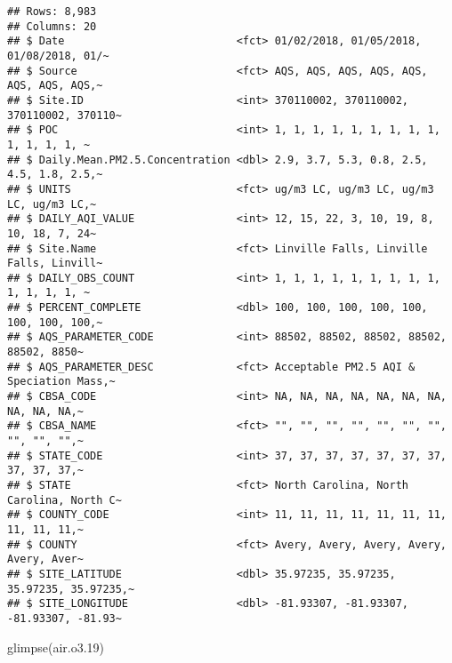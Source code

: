 \documentclass[
]{article}
\newenvironment{Shaded}{\begin{snugshade}}{\end{snugshade}}
\newcommand{\FloatTok}[1]{\textcolor[rgb]{0.00,0.00,0.81}{#1}}
\newcommand{\FunctionTok}[1]{\textcolor[rgb]{0.00,0.00,0.00}{#1}}
\newcommand{\NormalTok}[1]{#1}
\begin{document}
\begin{verbatim}
## Rows: 8,983
## Columns: 20
## $ Date                           <fct> 01/02/2018, 01/05/2018, 01/08/2018, 01/~
## $ Source                         <fct> AQS, AQS, AQS, AQS, AQS, AQS, AQS, AQS,~
## $ Site.ID                        <int> 370110002, 370110002, 370110002, 370110~
## $ POC                            <int> 1, 1, 1, 1, 1, 1, 1, 1, 1, 1, 1, 1, 1, ~
## $ Daily.Mean.PM2.5.Concentration <dbl> 2.9, 3.7, 5.3, 0.8, 2.5, 4.5, 1.8, 2.5,~
## $ UNITS                          <fct> ug/m3 LC, ug/m3 LC, ug/m3 LC, ug/m3 LC,~
## $ DAILY_AQI_VALUE                <int> 12, 15, 22, 3, 10, 19, 8, 10, 18, 7, 24~
## $ Site.Name                      <fct> Linville Falls, Linville Falls, Linvill~
## $ DAILY_OBS_COUNT                <int> 1, 1, 1, 1, 1, 1, 1, 1, 1, 1, 1, 1, 1, ~
## $ PERCENT_COMPLETE               <dbl> 100, 100, 100, 100, 100, 100, 100, 100,~
## $ AQS_PARAMETER_CODE             <int> 88502, 88502, 88502, 88502, 88502, 8850~
## $ AQS_PARAMETER_DESC             <fct> Acceptable PM2.5 AQI & Speciation Mass,~
## $ CBSA_CODE                      <int> NA, NA, NA, NA, NA, NA, NA, NA, NA, NA,~
## $ CBSA_NAME                      <fct> "", "", "", "", "", "", "", "", "", "",~
## $ STATE_CODE                     <int> 37, 37, 37, 37, 37, 37, 37, 37, 37, 37,~
## $ STATE                          <fct> North Carolina, North Carolina, North C~
## $ COUNTY_CODE                    <int> 11, 11, 11, 11, 11, 11, 11, 11, 11, 11,~
## $ COUNTY                         <fct> Avery, Avery, Avery, Avery, Avery, Aver~
## $ SITE_LATITUDE                  <dbl> 35.97235, 35.97235, 35.97235, 35.97235,~
## $ SITE_LONGITUDE                 <dbl> -81.93307, -81.93307, -81.93307, -81.93~
\end{verbatim}

\begin{Shaded}
\begin{Highlighting}[]
\FunctionTok{glimpse}\NormalTok{(air.o3}\FloatTok{.19}\NormalTok{)}
\end{Highlighting}
\end{Shaded}
\end{document}
